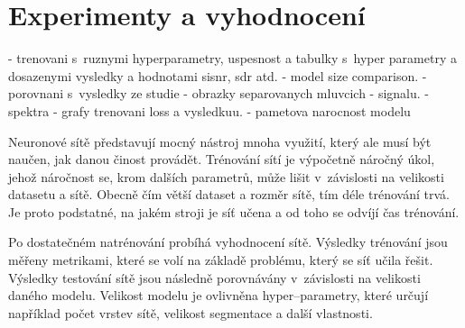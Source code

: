 \bigskip






\chapter{Experimenty a vyhodnocení}
\label{experimenty}
- trenovani s~ruznymi hyperparametry, uspesnost a tabulky s~hyper parametry a dosazenymi vysledky a hodnotami sisnr, sdr atd.
- model size comparison.
- porovnani s~vysledky ze studie
- obrazky separovanych mluvcich - signalu.
- spektra
- grafy trenovani loss a vysledkuu.
- pametova narocnost modelu



Neuronové sítě představují mocný nástroj mnoha využití, který ale musí být naučen, jak danou činost provádět. Trénování sítí je výpočetně náročný úkol, jehož náročnost se, krom dalších parametrů, může lišit v~závislosti na velikosti datasetu a sítě. Obecně čím větší dataset a rozměr sítě, tím déle trénování trvá. Je proto podstatné, na jakém stroji je síť učena a od toho se odvíjí čas trénování.

Po dostatečném natrénování probíhá vyhodnocení sítě. Výsledky trénování jsou měřeny metrikami, které se volí na základě problému, který se síť učila řešit. Výsledky testování sítě jsou následně porovnávány v~závislosti na velikosti daného modelu. Velikost modelu je ovlivněna hyper--parametry, které určují například počet vrstev sítě, velikost segmentace a další vlastnosti.

